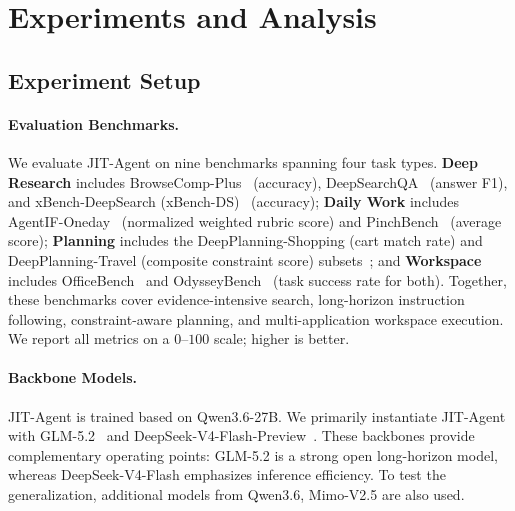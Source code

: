 \documentclass{article}
\newcommand{\ourmethod}{JIT-Agent\xspace}
\begin{document}
\vspace{-0.5em}
\section{Experiments and Analysis}
\vspace{-0.5em}
\subsection{Experiment Setup}
\vspace{-0.5em}
\paragraph{Evaluation Benchmarks.}
We evaluate \ourmethod on nine benchmarks spanning four task types. \textbf{Deep Research} includes BrowseComp-Plus~\citep{chen2025browsecompplusfairtransparentevaluation} (accuracy), DeepSearchQA~\citep{gupta2026deepsearchqabridgingcomprehensivenessgap} (answer F1), and xBench-DeepSearch (xBench-DS)~\citep{chen2025xbenchtrackingagentsproductivity} (accuracy); \textbf{Daily Work} includes AgentIF-Oneday~\citep{chen2026agentifonedaytasklevelinstructionfollowingbenchmark} (normalized weighted rubric score) and PinchBench~\citep{pinchbenchBestModels} (average score); \textbf{Planning} includes the DeepPlanning-Shopping (cart match rate) and DeepPlanning-Travel (composite constraint score) subsets~\citep{zhang2026deepplanningbenchmarkinglonghorizonagentic}; and \textbf{Workspace} includes OfficeBench~\citep{wang2024officebenchbenchmarkinglanguageagents} and OdysseyBench~\citep{wang2025odysseybenchevaluatingllmagents} (task success rate for both). Together, these benchmarks cover evidence-intensive search, long-horizon instruction following, constraint-aware planning, and multi-application workspace execution. We report all metrics on a $0$--$100$ scale; higher is better.

\vspace{-0.5em}
\paragraph{Backbone Models.}
\ourmethod is trained based on Qwen3.6-27B. We primarily instantiate \ourmethod with {GLM-5.2}~\citep{zai2026glm52} and {DeepSeek-V4-Flash-Preview}~\citep{deepseek2026v4}. These backbones provide complementary operating points: GLM-5.2 is a strong open long-horizon model, whereas DeepSeek-V4-Flash emphasizes inference efficiency. To test the generalization, additional models from Qwen3.6, Mimo-V2.5 are also used.
\end{document}

